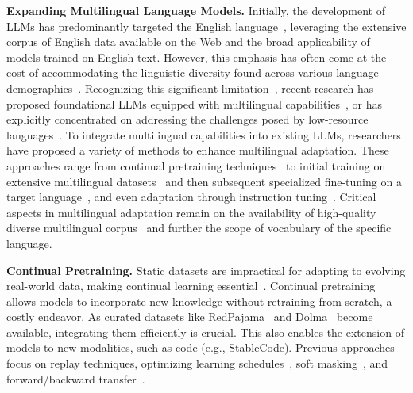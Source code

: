 


\textbf{Expanding Multilingual Language Models.} Initially, the development of LLMs has predominantly targeted the English language~\citep{brown2020language}, leveraging the extensive corpus of English data available on the Web and the broad applicability of models trained on English text. However, this emphasis has often come at the cost of accommodating the linguistic diversity found across various language demographics~\citep{zhu2023extrapolating,bang2023multitask,zhang2024m3exam}. Recognizing this significant limitation~\citep{robinson2023chatgpt,peng-etal-2024-humaneval}, recent research has proposed foundational LLMs equipped with multilingual capabilities~\citep{chai2023ernie, scao2022bloom,wei2023polylm,shliazhko2022mgpt}, or has explicitly concentrated on addressing the challenges posed by low-resource languages~\citep{ustun2024aya,singh2024aya,gala2023indictrans2}. To integrate multilingual capabilities into existing LLMs, researchers have proposed a variety of methods to enhance multilingual adaptation. These approaches range from continual pretraining techniques~\citep{ibrahim2024simple,gupta2023continual} to initial training on extensive multilingual datasets~\citep{scao2022bloom,chai2023ernie} and then subsequent specialized fine-tuning on a target language~\citep{yang2023bigtranslate, han-etal-2022-x}, and even adaptation through instruction tuning~\citep{shaham2024multilingual,kew2023turning,gala2024airavata}. Critical aspects in multilingual adaptation remain on the availability of high-quality diverse multilingual corpus~\citep{correa2024teenytinyllama} and further the scope of vocabulary of the specific language.


\textbf{Continual Pretraining.}  Static datasets are impractical for adapting to evolving real-world data, making continual learning essential~\citep{ring1998child,thrun1998lifelong}. Continual pretraining~\citep{gururangan2020dont} allows models to incorporate new knowledge without retraining from scratch, a costly endeavor. As curated datasets like RedPajama~\citep{together2023redpajama} and Dolma~\citep{soldaini2024dolma} become available, integrating them efficiently is crucial. This also enables the extension of models to new modalities, such as code (e.g., StableCode). Previous approaches focus on replay techniques, optimizing learning schedules~\citep{ibrahim2024simple}, soft masking~\citep{ke2023adapting}, and forward/backward transfer~\citep{yildiz2024investigating}.


